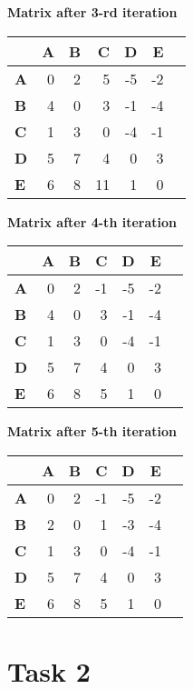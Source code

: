 \documentclass{article}
\begin{document}
\textbf{Matrix after 3-rd iteration}
\begin{table}[!htp]\centering
    \scriptsize
    \begin{tabular}{lrrrrrr}\toprule
    &\textbf{A} &\textbf{B} &\textbf{C} &\textbf{D} &\textbf{E} \\\midrule
    \textbf{A} &0 &2 &5 &-5 &-2 \\
    \textbf{B} &4 &0 &3 &-1 &-4 \\
    \textbf{C} &1 &3 &0 &-4 &-1 \\
    \textbf{D} &5 &7 &4 &0 &3 \\
    \textbf{E} &6 &8 &11 &1 &0 \\
    \bottomrule
    \end{tabular}
\end{table}

\textbf{Matrix after 4-th iteration}
\begin{table}[!htp]\centering
    \scriptsize
    \begin{tabular}{lrrrrrr}\toprule
    &\textbf{A} &\textbf{B} &\textbf{C} &\textbf{D} &\textbf{E} \\\midrule
    \textbf{A} &0 &2 &-1 &-5 &-2 \\
    \textbf{B} &4 &0 &3 &-1 &-4 \\
    \textbf{C} &1 &3 &0 &-4 &-1 \\
    \textbf{D} &5 &7 &4 &0 &3 \\
    \textbf{E} &6 &8 &5 &1 &0 \\
    \bottomrule
    \end{tabular}
\end{table}

\textbf{Matrix after 5-th iteration}
\begin{table}[!htp]\centering
    \scriptsize
    \begin{tabular}{lrrrrrr}\toprule
    &\textbf{A} &\textbf{B} &\textbf{C} &\textbf{D} &\textbf{E} \\\midrule
    \textbf{A} &0 &2 &-1 &-5 &-2 \\
    \textbf{B} &2 &0 &1 &-3 &-4 \\
    \textbf{C} &1 &3 &0 &-4 &-1 \\
    \textbf{D} &5 &7 &4 &0 &3 \\
    \textbf{E} &6 &8 &5 &1 &0 \\
    \bottomrule
    \end{tabular}
\end{table}

\section{Task 2}
\end{document}

